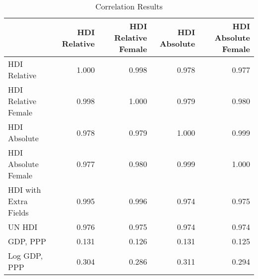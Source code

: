 \begin{table}
\caption{Correlation Results}
\begin{tabular}{lrrrr}
\toprule
 & HDI Relative & HDI Relative Female & HDI Absolute & HDI Absolute Female \\
\midrule
HDI Relative & 1.000 & 0.998 & 0.978 & 0.977 \\
HDI Relative Female & 0.998 & 1.000 & 0.979 & 0.980 \\
HDI Absolute & 0.978 & 0.979 & 1.000 & 0.999 \\
HDI Absolute Female & 0.977 & 0.980 & 0.999 & 1.000 \\
HDI with Extra Fields & 0.995 & 0.996 & 0.974 & 0.975 \\
UN HDI & 0.976 & 0.975 & 0.974 & 0.974 \\
GDP, PPP & 0.131 & 0.126 & 0.131 & 0.125 \\
Log GDP, PPP & 0.304 & 0.286 & 0.311 & 0.294 \\
\bottomrule
\end{tabular}
\end{table}
